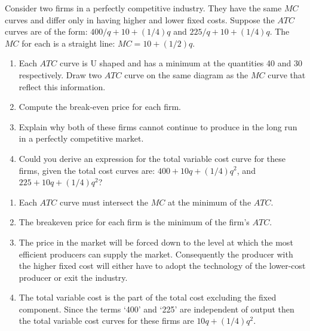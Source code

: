 \begin{enumialphparenastyle}
\begin{ex}\label{ex:ch9ex11}
Consider two firms in a perfectly competitive industry. They have the same $MC$ curves and differ only in having higher and lower fixed costs. Suppose the $ATC$ curves are of the form: $400/q+10+(1/4)q$ and $225/q+10+(1/4)q$. The $MC$ for each is a straight line: $MC=10+(1/2)q$.
\begin{enumerate}
	\item	Each $ATC$ curve is U shaped and has a minimum at the quantities 40 and 30 respectively. Draw two $ATC$ curve on the same diagram as the $MC$ curve that reflect this information.
	\item	Compute the break-even price for each firm.
	\item	Explain why both of these firms cannot continue to produce in the long run in a perfectly competitive market.
	\item	Could you derive an expression for the total variable cost curve for these firms, given the total cost curves are: $400+10q+(1/4)q^2$, and $225+10q+(1/4)q^2$?
\end{enumerate}
\begin{sol}
\begin{enumerate}
	\item	Each $ATC$ curve must intersect the $MC$ at the minimum of the $ATC$.
	\item	The breakeven price for each firm is the minimum of the firm's $ATC$.
	\item	The price in the market will be forced down to the level at which the most efficient producers can supply the market. Consequently the producer with the higher fixed cost will either have to adopt the technology of the lower-cost producer or exit the industry.
	\item	The total variable cost is the part of the total cost excluding the fixed component. Since the terms `400' and `225' are independent of output then the total variable cost curves for these firms are $10q+(1/4)q^2$. 
\end{enumerate}
\end{sol}
\end{ex}


\end{enumialphparenastyle}